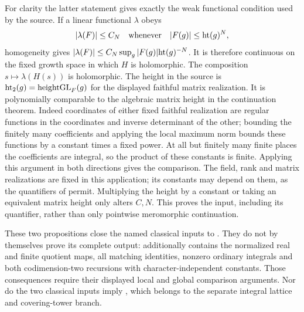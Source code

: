 For clarity the latter statement gives exactly the weak
functional condition used by the source.
If a linear functional \(\lambda\) obeys
\[
 |\lambda(F)|\le C_N
       \quad\hbox{whenever}\quad |F(g)|\le{\rm ht}(g)^N ,
\]
homogeneity gives
\(|\lambda(F)|\le C_N\sup_g|F(g)|{\rm ht}(g)^{-N}\).
It is therefore continuous on the fixed growth space in
which \(H\) is holomorphic.
The composition \(s\mapsto\lambda(H(s))\) is holomorphic.
The height in the source is
\({\rm ht}_2(g)={\rm heightGL}_F(g)\) for the displayed
faithful matrix realization.
It is polynomially comparable to the algebraic matrix
height in the continuation theorem.
Indeed coordinates of either fixed faithful realization
are regular functions in the coordinates and inverse
determinant of the other; bounding the finitely many
coefficients and applying the local maximum norm bounds
these functions by a constant times a fixed power.
At all but finitely many finite places the coefficients
are integral, so the product of these constants is finite.
Applying this argument in both directions gives the
comparison.  The field, rank and matrix realizations are
fixed in this application; its constants may depend on
them, as the quantifiers of  permit.
Multiplying the height by a constant or taking an
equivalent matrix height only alters \(C,N\).
This proves the  input, including its
 quantifier, rather than only pointwise
meromorphic continuation.

These two propositions close the named classical inputs
to .
They do not by themselves prove its complete output:
 additionally contains the
normalized real and finite quotient maps, all matching
identities, nonzero ordinary integrals and both
codimension-two recursions with character-independent
constants.
Those consequences require their displayed local and
global comparison arguments.
Nor do the two classical inputs imply
, which belongs to the separate
integral lattice and covering-tower branch.
